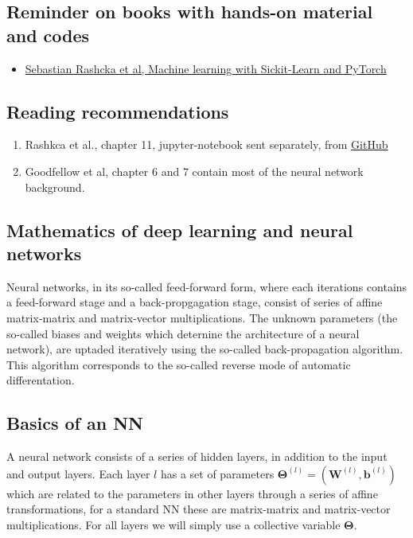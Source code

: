 \documentclass[%
oneside,                 %
final,                   %
10pt]{article}
\begin{document}
\subsection{Reminder on books with hands-on material and codes}
\begin{block}{}
\begin{itemize}
\item \href{{https://sebastianraschka.com/blog/2022/ml-pytorch-book.html}}{Sebastian Rashcka et al, Machine learning with Sickit-Learn and PyTorch}
\end{itemize}

\noindent
\end{block}

\subsection{Reading recommendations}

\begin{enumerate}
\item Rashkca et al., chapter 11, jupyter-notebook sent separately, from \href{{https://github.com/rasbt/machine-learning-book}}{GitHub}

\item Goodfellow et al, chapter 6 and 7 contain most of the neural network background.
\end{enumerate}

\noindent
\subsection{Mathematics of deep learning and neural networks}

Neural networks, in its so-called feed-forward form, where each
iterations contains a feed-forward stage and a back-propgagation
stage, consist of series of affine matrix-matrix and matrix-vector
multiplications. The unknown parameters (the so-called biases and
weights which deternine the architecture of a neural network), are
uptaded iteratively using the so-called back-propagation algorithm.
This algorithm corresponds to the so-called reverse mode of 
automatic differentation. 

\subsection{Basics of an NN}

A neural network consists of a series of hidden layers, in addition to
the input and output layers.  Each layer $l$ has a set of parameters
$\bm{\Theta}^{(l)}=(\bm{W}^{(l)},\bm{b}^{(l)})$ which are related to the
parameters in other layers through a series of affine transformations,
for a standard NN these are matrix-matrix and matrix-vector
multiplications.  For all layers we will simply use a collective variable $\bm{\Theta}$.
\end{document}
